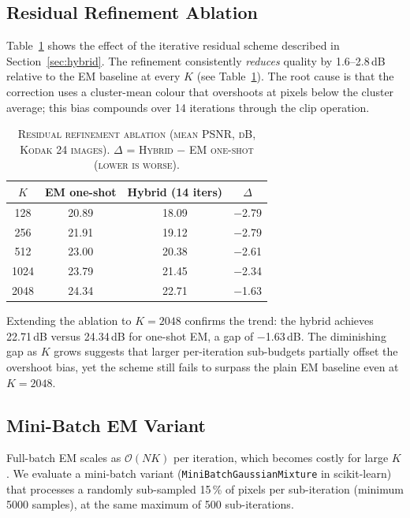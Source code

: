 \documentclass[a4paper,conference]{IEEEtran}
\begin{document}
\subsection{Residual Refinement Ablation}
\label{subsec:hybrid_ablation}

Table~\ref{tab:hybrid} shows the effect of the iterative residual scheme
described in Section~\ref{sec:hybrid}.
The refinement consistently \emph{reduces} quality by 1.6--2.8\,dB
relative to the EM baseline at every $K$ (see Table~\ref{tab:hybrid}).
The root cause is that the correction uses a cluster-mean colour that
overshoots at pixels below the cluster average; this bias compounds over
14 iterations through the clip operation.

\begin{table}[!t]
\renewcommand{\arraystretch}{1.3}
\caption{\textsc{Residual refinement ablation (mean PSNR, dB, Kodak 24 images).
$\Delta$ = Hybrid $-$ EM one-shot (lower is worse).}}
\label{tab:hybrid}
\centering
\begin{tabular}{|c|c|c|c|}
\hline
$K$ & \textbf{EM one-shot} & \textbf{Hybrid (14 iters)} & $\Delta$ \\
\hline
128  & 20.89 & 18.09 & $-$2.79 \\
256  & 21.91 & 19.12 & $-$2.79 \\
512  & 23.00 & 20.38 & $-$2.61 \\
1024 & 23.79 & 21.45 & $-$2.34 \\
2048 & 24.34 & 22.71 & $-$1.63 \\
\hline
\end{tabular}
\end{table}

Extending the ablation to $K\!=\!2048$ confirms the trend: the hybrid
achieves 22.71\,dB versus 24.34\,dB for one-shot EM,
a gap of $-$1.63\,dB.
The diminishing gap as $K$ grows suggests that larger per-iteration
sub-budgets partially offset the overshoot bias, yet the scheme still
fails to surpass the plain EM baseline even at $K\!=\!2048$.

\subsection{Mini-Batch EM Variant}
\label{subsec:minibatch}

Full-batch EM scales as $\mathcal{O}(NK)$ per iteration, which becomes costly
for large $K$.  We evaluate a mini-batch variant
(\texttt{MiniBatchGaussianMixture} in scikit-learn) that processes a
randomly sub-sampled 15\,\% of pixels per sub-iteration (minimum 5000 samples),
at the same maximum of 500 sub-iterations.
\end{document}
